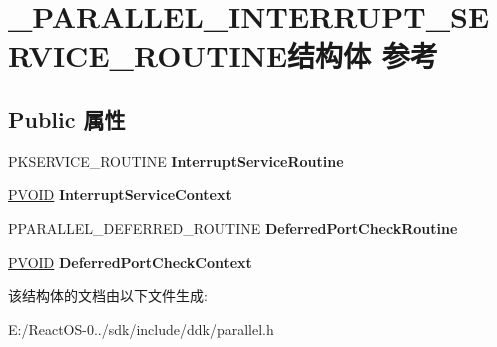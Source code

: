\hypertarget{struct___p_a_r_a_l_l_e_l___i_n_t_e_r_r_u_p_t___s_e_r_v_i_c_e___r_o_u_t_i_n_e}{}\section{\+\_\+\+P\+A\+R\+A\+L\+L\+E\+L\+\_\+\+I\+N\+T\+E\+R\+R\+U\+P\+T\+\_\+\+S\+E\+R\+V\+I\+C\+E\+\_\+\+R\+O\+U\+T\+I\+N\+E结构体 参考}
\label{struct___p_a_r_a_l_l_e_l___i_n_t_e_r_r_u_p_t___s_e_r_v_i_c_e___r_o_u_t_i_n_e}
\subsection*{Public 属性}
\begin{DoxyCompactItemize}
\item 
\mbox{\label{struct___p_a_r_a_l_l_e_l___i_n_t_e_r_r_u_p_t___s_e_r_v_i_c_e___r_o_u_t_i_n_e_a8af28287a32bef84136083425cc09cd7}} 
P\+K\+S\+E\+R\+V\+I\+C\+E\+\_\+\+R\+O\+U\+T\+I\+NE {\bfseries Interrupt\+Service\+Routine}
\item 
\mbox{\label{struct___p_a_r_a_l_l_e_l___i_n_t_e_r_r_u_p_t___s_e_r_v_i_c_e___r_o_u_t_i_n_e_a63228be594765ef4dda45f090e13c07f}} 
\hyperlink{interfacevoid}{P\+V\+O\+ID} {\bfseries Interrupt\+Service\+Context}
\item 
\mbox{\label{struct___p_a_r_a_l_l_e_l___i_n_t_e_r_r_u_p_t___s_e_r_v_i_c_e___r_o_u_t_i_n_e_a3297b53a24f227b42081d2601356c4dc}} 
P\+P\+A\+R\+A\+L\+L\+E\+L\+\_\+\+D\+E\+F\+E\+R\+R\+E\+D\+\_\+\+R\+O\+U\+T\+I\+NE {\bfseries Deferred\+Port\+Check\+Routine}
\item 
\mbox{\label{struct___p_a_r_a_l_l_e_l___i_n_t_e_r_r_u_p_t___s_e_r_v_i_c_e___r_o_u_t_i_n_e_ad0b02188bf3f22f3920d7d48c47bc804}} 
\hyperlink{interfacevoid}{P\+V\+O\+ID} {\bfseries Deferred\+Port\+Check\+Context}
\end{DoxyCompactItemize}


该结构体的文档由以下文件生成\+:\begin{DoxyCompactItemize}
\item 
E\+:/\+React\+O\+S-\/0../sdk/include/ddk/parallel.\+h\end{DoxyCompactItemize}
